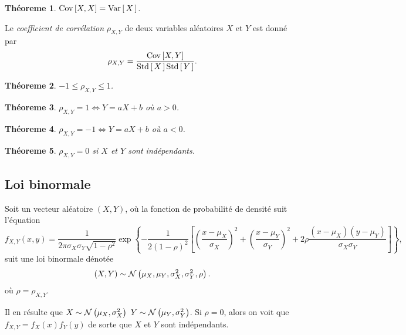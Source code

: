 \documentclass[11pt]{article}
\newcommand\Norm[2]{%
	\ensuremath{%
		\mathcal{N}\left(#1,#2\right)%
	}%
}%
\newcommand\BiNorm[5]{%
	\ensuremath{%
		\mathcal{N}\left(#1,#2,#3,#4,#5\right)%
	}%
}%
\newcommand\Var[1]{%
	\ensuremath{%
		\mathrm{Var}\left[\,#1\,\right]%
	}%
}%
\newcommand\Std[1]{%
	\ensuremath{%
		\mathrm{Std}\left[\,#1\,\right]%
	}%
}%
\newcommand\Cov[2]{%
	\ensuremath{%
		\mathrm{Cov}\left[#1,#2\right]%
	}%
}%
\newtheorem{theoreme}{Théoreme}[section]
\begin{document}
\begin{theoreme}
	$\Cov{X}{X}=\Var{X}$.
\end{theoreme}

\begin{definition}
	Le \textit{coefficient de corrélation} $\rho_{X,Y}$ de deux variables
	aléatoires $X$ et $Y$ est donné par
	\begin{equation*}
		\rho_{X,Y}=\frac{\Cov{X}{Y}}{\Std{X}\Std{Y}}.
	\end{equation*}
\end{definition}

\begin{theoreme}
	$-1\leq\rho_{X,Y}\leq 1$.
\end{theoreme}

\begin{theoreme}
	$\rho_{X,Y}=1\Leftrightarrow Y=aX+b$ où $a>0$.
\end{theoreme}

\begin{theoreme}
	$\rho_{X,Y}=-1\Leftrightarrow Y=aX+b$ où $a<0$.
\end{theoreme}

\begin{theoreme}
	$\rho_{X,Y}=0$ si $X$ et $Y$ sont indépendants.
\end{theoreme}



\subsection{Loi binormale}
Soit un vecteur aléatoire $(X,Y)$, où la fonction de probabilité de densité suit
l'équation 
\begin{equation*}
	f_{X,Y}(x,y)=\frac{1}{2\pi\sigma_X\sigma_Y\sqrt{1-\rho^2}}
	\exp\left\{-\frac{1}{2(1-\rho)^2}\left[
		\left(\frac{x-\mu_X}{\sigma_X}\right)^2+
		\left(\frac{x-\mu_Y}{\sigma_Y}\right)^2+
		2\rho\frac{(x-\mu_X)(y-\mu_Y)}{\sigma_X\sigma_Y}
	\right]\right\},
\end{equation*}
suit une loi binormale dénotée
\begin{equation*}
	(X,Y)\sim\BiNorm{\mu_X}{\mu_Y}{\sigma_X^2}{\sigma_Y^2}{\rho}.
\end{equation*}
où $\rho=\rho_{X,Y}$.

Il en résulte que $X\sim\Norm{\mu_X}{\sigma_X^2}$ $Y\sim\Norm{\mu_Y}{\sigma_Y^2}$.
Si $\rho=0$, alors on voit que $f_{X,Y}=f_X(x)f_Y(y)$ de sorte que $X$ et $Y$
sont indépendants.
\end{document}
